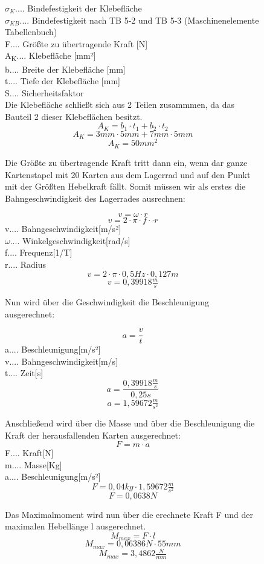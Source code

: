 \begin{figure}
$\sigma_{K}$.... Bindefestigkeit der Klebefläche \\
$\sigma_{KB}$.... Bindefestigkeit nach TB 5-2 und TB 5-3 (Maschinenelemente Tabellenbuch)\\
F.... Größte zu übertragende Kraft [N]\\
A\textsubscript{K}.... Klebefläche [mm²]\\
b.... Breite der Klebefläche [mm]\\
t.... Tiefe der Klebefläche [mm]\\
S.... Sicherheitsfaktor\\

Die Klebefläche schließt sich aus 2 Teilen zusammmen, da das Bauteil 2 dieser Klebeflächen besitzt.
\[A_{K} = b_{1}\cdot t_{1}+b_{2}\cdot t_{2}\]
\[A_{K} =3 mm\cdot 5 mm+7 mm\cdot 5 mm\]
\[A_{K} = 50 mm^{2}\]

Die Größte zu übertragende Kraft tritt dann ein, wenn dar ganze Kartenstapel mit 20 Karten aus dem
Lagerrad und auf den Punkt mit der Größten Hebelkraft fällt. Somit müssen wir als erstes die
Bahngeschwindigkeit des Lagerrades ausrechnen:

\[v = \omega \cdot r\]
\[v = 2 \cdot \pi \cdot f \cdot \cdot r\]
v.... Bahngeschwindigkeit[m/s²]\\
$\omega$.... Winkelgeschwindigkeit[rad/s]\\
f.... Frequenz[1/T]\\
r.... Radius\\
\[v = 2 \cdot \pi \cdot 0,5 Hz \cdot 0,127 m\]
\[v = 0,39918 \tfrac{m}{s}\]


Nun wird über die Geschwindigkeit die Beschleunigung ausgerechnet:

\[a = \frac{v}{t}\]
a.... Beschleunigung[m/s²]\\
v.... Bahngeschwindigkeit[m/s]\\
t.... Zeit[s]\\
\[a = \frac{0,39918\tfrac{m}{s}}{0,25s}\]
\[a = 1,59672\tfrac{m}{s^{2}}\]

Anschließend wird über die Masse und über die Beschleunigung die Kraft der herausfallenden Karten ausgerechnet:
\[F = m \cdot a\]
F.... Kraft[N]\\
m.... Masse[Kg]\\
a.... Beschleunigung[m/s²]\\
\[F = 0,04 kg \cdot 1,59672\tfrac{m}{s^{2}}\]
\[F = 0,0638N\]

Das Maximalmoment wird nun über die erechnete Kraft F und der maximalen Hebellänge l ausgerechnet.
\[M_{max}=F\cdot l\]
\[M_{max}=0,06386N\cdot 55mm\]
\[M_{max}=3,4862\tfrac{N}{mm}\]


\end{figure}
